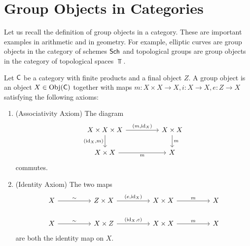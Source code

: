 \section{Group Objects in Categories}
Let us recall the definition of group objects in a category. These are important examples in arithmetic and in geometry. For example, elliptic curves are group objects in the category of schemes $\mathsf{Sch}$ and topological groups are group objects in the category of topological spaces $\Top$. 
\begin{definition}
    Let $\mathsf{C}$ be a category with finite products and a final object $Z$. A group object is an object $X\in\mathrm{Obj}(\mathsf{C})$ together with maps $m:X\times X\to X, i:X\to X, e:Z\to X$ satisfying the following axioms:
    \begin{enumerate}[label=(\alph*)]
        \item (Associativity Axiom) The diagram
        $$%
        \begin{tikzcd}
            {X\times X\times X} && {X\times X} \\
            {X\times X} && X
            \arrow["{(m,\id_{X})}", from=1-1, to=1-3]
            \arrow["m", from=1-3, to=2-3]
            \arrow["m"', from=2-1, to=2-3]
            \arrow["{(\id_{X},m)}"', from=1-1, to=2-1]
        \end{tikzcd}$$
        commutes. 
        \item (Identity Axiom) The two maps
        $$%
        \begin{tikzcd}
            X && {Z\times X} && {X\times X} && X \\
            X && {X\times Z} && {X\times X} && X
            \arrow["{(e,\id_{X})}", from=1-3, to=1-5]
            \arrow["m", from=1-5, to=1-7]
            \arrow["\sim", from=1-1, to=1-3]
            \arrow["m", from=2-5, to=2-7]
            \arrow["{(\id_{X},e)}", from=2-3, to=2-5]
            \arrow["\sim", from=2-1, to=2-3]
        \end{tikzcd}$$
        are both the identity map on $X$. 

\end{enumerate}
\end{definition}

